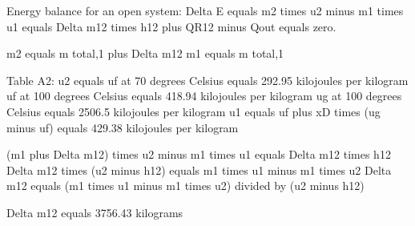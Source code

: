 Energy balance for an open system:  
Delta E equals m2 times u2 minus m1 times u1 equals Delta m12 times h12 plus QR12 minus Qout equals zero.  

m2 equals m total,1 plus Delta m12  
m1 equals m total,1  

Table A2:  
u2 equals uf at 70 degrees Celsius equals 292.95 kilojoules per kilogram  
uf at 100 degrees Celsius equals 418.94 kilojoules per kilogram  
ug at 100 degrees Celsius equals 2506.5 kilojoules per kilogram  
u1 equals uf plus xD times (ug minus uf) equals 429.38 kilojoules per kilogram  

(m1 plus Delta m12) times u2 minus m1 times u1 equals Delta m12 times h12  
Delta m12 times (u2 minus h12) equals m1 times u1 minus m1 times u2  
Delta m12 equals (m1 times u1 minus m1 times u2) divided by (u2 minus h12)  

Delta m12 equals 3756.43 kilograms